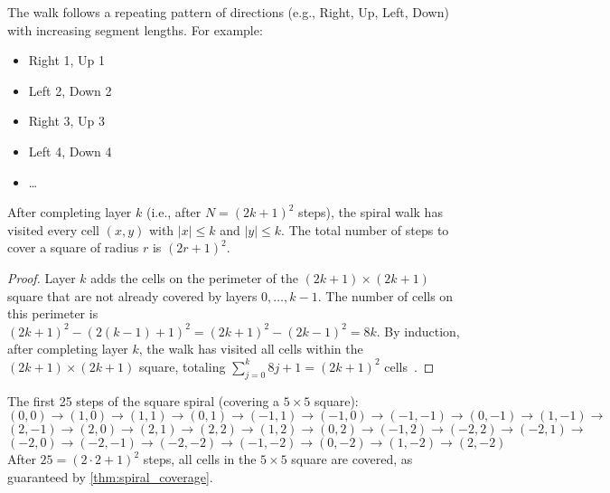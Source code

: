 The walk follows a repeating pattern of directions (e.g., Right, Up, Left, Down) with increasing segment lengths. For example:
\begin{itemize}
    \item Right 1, Up 1
    \item Left 2, Down 2
    \item Right 3, Up 3
    \item Left 4, Down 4
    \item \ldots
\end{itemize}

\begin{theorem}\label{thm:spiral_coverage}
After completing layer $k$ (i.e., after $N = (2k+1)^2$ steps), the spiral walk has visited every cell $(x, y)$ with $|x| \le k$ and $|y| \le k$. The total number of steps to cover a square of radius $r$ is $(2r+1)^2$.
\end{theorem}

\begin{proof}
Layer $k$ adds the cells on the perimeter of the $(2k+1) \times (2k+1)$ square that are not already covered by layers $0, \ldots, k-1$. The number of cells on this perimeter is $(2k+1)^2 - (2(k-1)+1)^2 = (2k+1)^2 - (2k-1)^2 = 8k$. By induction, after completing layer $k$, the walk has visited all cells within the $(2k+1) \times (2k+1)$ square, totaling $\sum_{j=0}^{k} 8j + 1 = (2k+1)^2$ cells~\cite{stein1964}.
\end{proof}

\begin{example}\label{ex:spiral_25}
The first 25 steps of the square spiral (covering a $5 \times 5$ square):
\[
(0,0) \to (1,0) \to (1,1) \to (0,1) \to (-1,1) \to (-1,0) \to (-1,-1) \to (0,-1) \to (1,-1) \to
\]
\[
(2,-1) \to (2,0) \to (2,1) \to (2,2) \to (1,2) \to (0,2) \to (-1,2) \to (-2,2) \to (-2,1) \to
\]
\[
(-2,0) \to (-2,-1) \to (-2,-2) \to (-1,-2) \to (0,-2) \to (1,-2) \to (2,-2)
\]
After $25 = (2 \cdot 2 + 1)^2$ steps, all cells in the $5 \times 5$ square are covered, as guaranteed by \cref{thm:spiral_coverage}.
\end{example}

